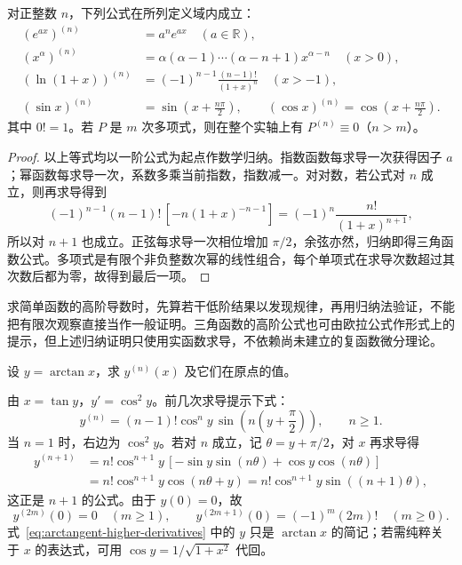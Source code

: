 \begin{proposition}
\label{prop:standard-higher-derivative-formulas}
对正整数 $n$，下列公式在所列定义域内成立：
\begin{align}
    (e^{ax})^{(n)}&=a^ne^{ax}\quad(a\in\mathbb R),\label{eq:exponential-higher-derivatives}\\
    (x^\alpha)^{(n)}&=\alpha(\alpha-1)\cdots(\alpha-n+1)x^{\alpha-n}
    \quad(x>0),\label{eq:power-higher-derivatives}\\
    (\ln(1+x))^{(n)}&=(-1)^{n-1}\frac{(n-1)!}{(1+x)^n}
    \quad(x>-1),\label{eq:logarithm-higher-derivatives}\\
    (\sin x)^{(n)}&=\sin\left(x+\frac{n\pi}2\right),\qquad
    (\cos x)^{(n)}=\cos\left(x+\frac{n\pi}2\right).
    \label{eq:trigonometric-higher-derivatives}
\end{align}
其中 $0!=1$。若 $P$ 是 $m$ 次多项式，则在整个实轴上有 $P^{(n)}\equiv0$（$n>m$）。
\end{proposition}
\begin{proof}
以上等式均以一阶公式为起点作数学归纳。指数函数每求导一次获得因子 $a$；幂函数每求导一次，系数多乘当前指数，指数减一。对对数，若公式对 $n$ 成立，则再求导得到
\[
    (-1)^{n-1}(n-1)!\,[-n(1+x)^{-n-1}]
    =(-1)^n\frac{n!}{(1+x)^{n+1}},
\]
所以对 $n+1$ 也成立。正弦每求导一次相位增加 $\pi/2$，余弦亦然，归纳即得三角函数公式。多项式是有限个非负整数次幂的线性组合，每个单项式在求导次数超过其次数后都为零，故得到最后一项。
\end{proof}

求简单函数的高阶导数时，先算若干低阶结果以发现规律，再用归纳法验证，不能把有限次观察直接当作一般证明。三角函数的高阶公式也可由欧拉公式作形式上的提示，但上述归纳证明只使用实函数求导，不依赖尚未建立的复函数微分理论。

\begin{example}
\label{ex:arctangent-higher-derivatives}
设 $y=\arctan x$，求 $y^{(n)}(x)$ 及它们在原点的值。
\end{example}
\begin{solve}
由 $x=\tan y$，$y'=\cos^2y$。前几次求导提示下式：
\begin{equation}
\label{eq:arctangent-higher-derivatives}
    y^{(n)}=(n-1)!\cos^ny\,
    \sin\left(n\left(y+\frac\pi2\right)\right),\qquad n\geq1.
\end{equation}
当 $n=1$ 时，右边为 $\cos^2y$。若对 $n$ 成立，记 $\theta=y+\pi/2$，对 $x$ 再求导得
\[
\begin{aligned}
    y^{(n+1)}
    &=n!\cos^{n+1}y\,
      [-\sin y\sin(n\theta)+\cos y\cos(n\theta)]\\
    &=n!\cos^{n+1}y\cos(n\theta+y)
     =n!\cos^{n+1}y\sin((n+1)\theta),
\end{aligned}
\]
这正是 $n+1$ 的公式。由于 $y(0)=0$，故
\[
    y^{(2m)}(0)=0\quad(m\geq1),\qquad
    y^{(2m+1)}(0)=(-1)^m(2m)!\quad(m\geq0).
\]
式~\eqref{eq:arctangent-higher-derivatives} 中的 $y$ 只是 $\arctan x$ 的简记；若需纯粹关于 $x$ 的表达式，可用 $\cos y=1/\sqrt{1+x^2}$ 代回。
\end{solve}


